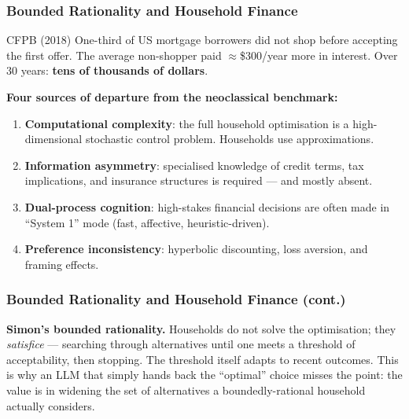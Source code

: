 \documentclass[9pt,t]{beamer}
\begin{document}
\begin{frame}
\frametitle{Bounded Rationality and Household Finance}

\begin{block}{CFPB (2018)}
  One-third of US mortgage borrowers did not shop before accepting the first offer.
  The average non-shopper paid $\approx$\$300/year more in interest.
  Over 30 years: \textbf{tens of thousands of dollars}.
\end{block}

\medskip
\textbf{Four sources of departure from the neoclassical benchmark:}
\begin{enumerate}
  \item \textbf{Computational complexity}: the full household optimisation is a high-dimensional stochastic control problem. Households use approximations.
  \item \textbf{Information asymmetry}: specialised knowledge of credit terms, tax implications, and insurance structures is required — and mostly absent.
  \item \textbf{Dual-process cognition}: high-stakes financial decisions are often made in ``System 1'' mode (fast, affective, heuristic-driven).
  \item \textbf{Preference inconsistency}: hyperbolic discounting, loss aversion, and framing effects.
\end{enumerate}
\end{frame}

\begin{frame}
\frametitle{Bounded Rationality and Household Finance (cont.)}

\begin{bigpicture}
  \textbf{Simon's bounded rationality.} Households do not solve the optimisation; they
  \emph{satisfice} --- searching through alternatives until one meets a threshold of
  acceptability, then stopping. The threshold itself adapts to recent outcomes. This is
  why an LLM that simply hands back the ``optimal'' choice misses the point: the value is
  in widening the set of alternatives a boundedly-rational household actually considers.
\end{bigpicture}
\end{frame}
\end{document}
